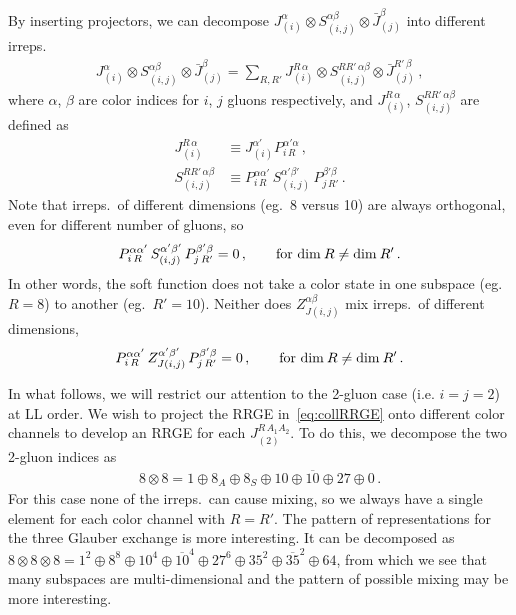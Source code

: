 \documentclass[letterpaper,11pt]{article}
\begin{document}
By inserting projectors, we can decompose $J_{(i)}^{\alpha} \otimes S_{(i,j)}^{\alpha\beta} \otimes \bar J_{(j)}^{\beta}$ into different irreps.
\begin{align}
  J_{(i)}^{\alpha} \otimes S_{(i,j)}^{\alpha\beta} \otimes \bar J_{(j)}^{\beta} = \sum_{R,R'} J_{(i)}^{R\,\alpha} \otimes S_{(i,j)}^{RR'\,\alpha\beta} \otimes \bar J_{(j)}^{R'\,\beta}\,,
\end{align}
where $\alpha$, $\beta$ are color indices for $i$, $j$ gluons respectively, and $J_{(i)}^{R\,\alpha}$, $S_{(i,j)}^{RR'\,\alpha\beta}$ are defined as 
\begin{align}\label{eq:J_R}
  J_{(i)}^{R\,\alpha} &\equiv J_{(i)}^{\alpha'} P_{i\, R}^{\alpha'\alpha}\,, \\
  \label{eq:S_R}
  S_{(i,j)}^{RR'\,\alpha\beta} &\equiv P_{i\,R}^{\alpha\alpha'} \, S_{(i,j)}^{\alpha'\beta'} \, P_{j\,R'}^{\beta'\beta}\,.
\end{align}
Note that irreps.~of different dimensions (eg.~8 versus 10) are always orthogonal, even for different number of gluons, so
\begin{align}
  P_{i\,R}^{\alpha\alpha'} \, S_{(i,j)}^{\alpha'\beta'} \, P_{j\,R'}^{\beta'\beta} = 0\,,\qquad 
   \text{for } {\rm dim}\: R\neq {\rm dim}\: R'\,.
\end{align}
In other words, the soft function does not take a color state in one subspace (eg.~$R=8$) to another (eg.~$R'=10$). Neither does $Z_{J(i,j)}^{\alpha\beta}$ mix  irreps.~of different dimensions, 
\begin{align}
  P_{i\,R}^{\alpha\alpha'} \, Z_{J(i,j)}^{\alpha'\beta'} \, P_{j\,R'}^{\beta'\beta} = 0\,,\qquad 
  \text{for } {\rm dim}\: R\neq {\rm dim}\: R' \,.
\end{align}


In what follows, we will restrict our attention to the 2-gluon case (i.e. $i = j = 2$) at LL order.  
We wish to project the RRGE in~\eqref{eq:collRRGE} onto different color channels to develop an RRGE for each $J_{(2)}^{R\,A_1A_2}$. To do this, we decompose the two 2-gluon indices as
\begin{align}\label{eq:2gluon_decomp}
  8\otimes8=1\oplus 8_A\oplus 8_S\oplus 10\oplus \overline{10}\oplus 27\oplus 0\,.
\end{align}
For this case none of the irreps.~can cause mixing, so we always have a single element for each color channel with $R=R'$. 
The pattern of representations for the three Glauber exchange is more interesting. It can be decomposed as $8\otimes8\otimes8=1^2 \oplus 8^8 \oplus 10^4 \oplus \overline{10}^4 \oplus 27^6 \oplus 35^2 \oplus \overline{35}^2 \oplus 64$, from which we see that many subspaces are multi-dimensional and the pattern of possible mixing may be more interesting. 
\end{document}
